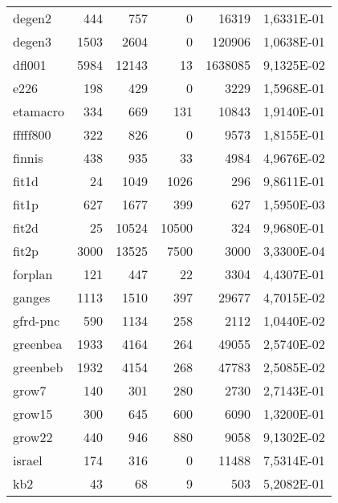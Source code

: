 {\begin{longtable}{>{\ttfamily}lrrrrc}
degen2       & 444       & 757       & 0           & 16319    & \num{1,6331E-01} \\
degen3       & 1503      & 2604      & 0           & 120906   & \num{1,0638E-01} \\
dfl001       & 5984      & 12143     & 13          & 1638085  & \num{9,1325E-02} \\
e226         & 198       & 429       & 0           & 3229     & \num{1,5968E-01} \\
etamacro     & 334       & 669       & 131         & 10843    & \num{1,9140E-01} \\
fffff800     & 322       & 826       & 0           & 9573     & \num{1,8155E-01} \\
finnis       & 438       & 935       & 33          & 4984     & \num{4,9676E-02} \\
fit1d        & 24        & 1049      & 1026        & 296      & \num{9,8611E-01} \\
fit1p        & 627       & 1677      & 399         & 627      & \num{1,5950E-03} \\
fit2d        & 25        & 10524     & 10500       & 324      & \num{9,9680E-01} \\
fit2p        & 3000      & 13525     & 7500        & 3000     & \num{3,3300E-04} \\
forplan      & 121       & 447       & 22          & 3304     & \num{4,4307E-01} \\
ganges       & 1113      & 1510      & 397         & 29677    & \num{4,7015E-02} \\
gfrd-pnc     & 590       & 1134      & 258         & 2112     & \num{1,0440E-02} \\
greenbea     & 1933      & 4164      & 264         & 49055    & \num{2,5740E-02} \\
greenbeb     & 1932      & 4154      & 268         & 47783    & \num{2,5085E-02} \\
grow7        & 140       & 301       & 280         & 2730     & \num{2,7143E-01} \\
grow15       & 300       & 645       & 600         & 6090     & \num{1,3200E-01} \\
grow22       & 440       & 946       & 880         & 9058     & \num{9,1302E-02} \\
israel       & 174       & 316       & 0           & 11488    & \num{7,5314E-01} \\
kb2          & 43        & 68        & 9           & 503      & \num{5,2082E-01} \\

\end{longtable}}
